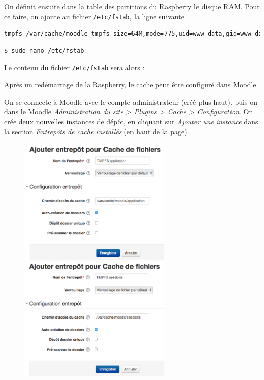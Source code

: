 \documentclass[11pt]{article}
\begin{document}
On définit ensuite dans la table des partitions du Raspberry le disque RAM. Pour ce faire, on ajoute au fichier \lstinline{/etc/fstab}, la ligne suivante
\begin{lstlisting}[language=bash]
tmpfs /var/cache/moodle tmpfs size=64M,mode=775,uid=www-data,gid=www-data 0 0
\end{lstlisting}

\begin{lstlisting}[language=bash]
$ sudo nano /etc/fstab
\end{lstlisting}

Le contenu du fichier \lstinline{/etc/fstab} sera alors : 


Après un redémarrage de la Raspberry, le cache peut être configuré dans Moodle.

On se connecte à Moodle avec le compte administrateur (créé plus haut), puis on dans le Moodle \emph{Administration du site > Plugins > Cache > Configuration}. On crée deux nouvelles instances de dépôt, en cliquant sur \emph{Ajouter une instance} dans la section \emph{Entrepôts de cache installés} (en haut de la page).

\begin{figure}[!ht]
\begin{minipage}[b]{0.45\linewidth} %
\centering
\includegraphics[width=7.3cm]{cache-application.png}
\end{minipage}
\hspace{\fill} %
\begin{minipage}[b]{0.45\linewidth}
\centering
\includegraphics[width=7.3cm]{cache-sessions.png}
\end{minipage}
\end{figure}
\end{document}
